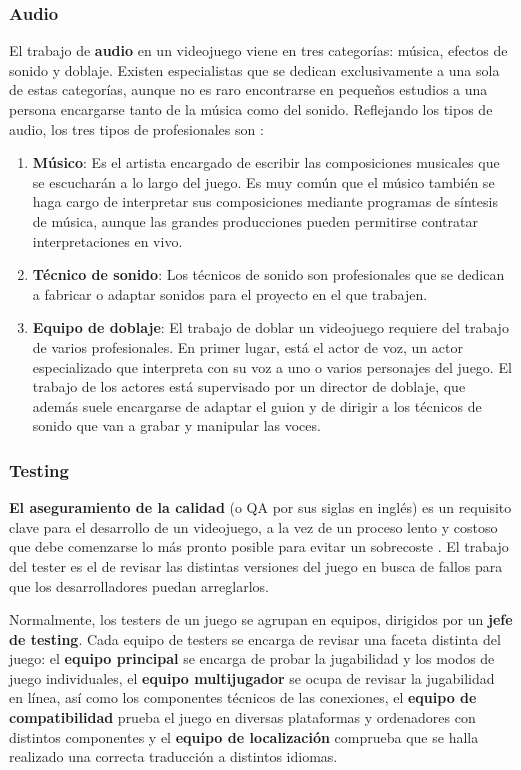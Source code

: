 \subsubsection{Audio}
El trabajo de \textbf{audio} en un videojuego viene en tres categorías: música, efectos de sonido y doblaje. Existen especialistas que se dedican exclusivamente a una sola de estas categorías, aunque no es raro encontrarse en pequeños estudios a una persona encargarse tanto de la música como del sonido. Reflejando los tipos de audio, los tres tipos de profesionales son \cite{development_and_production}:
\begin{enumerate}
\item \textbf{Músico}: Es el artista encargado de escribir las composiciones musicales que se escucharán a lo largo del juego. Es muy común que el músico también se haga cargo de interpretar sus composiciones mediante programas de síntesis de música, aunque las grandes producciones pueden permitirse contratar interpretaciones en vivo.
\item \textbf{Técnico de sonido}: Los técnicos de sonido son profesionales que se dedican a fabricar o adaptar sonidos para el proyecto en el que trabajen.
\item \textbf{Equipo de doblaje}: El trabajo de doblar un videojuego requiere del trabajo de varios profesionales. En primer lugar, está el actor de voz, un actor especializado que interpreta con su voz a uno o varios personajes del juego. El trabajo de los actores está supervisado por un director de doblaje, que además suele encargarse de adaptar el guion y de dirigir a los técnicos de sonido que van a grabar y manipular las voces.
\end{enumerate}

\subsubsection{Testing}
\textbf{El aseguramiento de la calidad} (o QA por sus siglas en inglés) es un requisito clave para el desarrollo de un videojuego, a la vez de un proceso lento y costoso que debe comenzarse lo más pronto posible para evitar un sobrecoste \cite{development_and_production}. El trabajo del tester es el de revisar las distintas versiones del juego en busca de fallos para que los desarrolladores puedan arreglarlos.

Normalmente, los testers de un juego se agrupan en equipos, dirigidos por un \textbf{jefe de testing}. Cada equipo de testers se encarga de revisar una faceta distinta del juego: el \textbf{equipo principal} se encarga de probar la jugabilidad y los modos de juego individuales, el \textbf{equipo multijugador} se ocupa de revisar la jugabilidad en línea, así como los componentes técnicos de las conexiones, el \textbf{equipo de compatibilidad} prueba el juego en diversas plataformas y ordenadores con distintos componentes y el \textbf{equipo de localización} comprueba que se halla realizado una correcta traducción a distintos idiomas.

